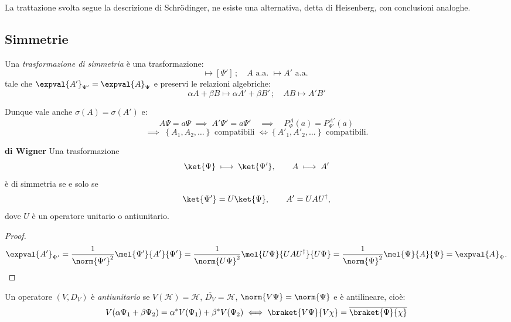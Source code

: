 \begin{remark}
    La trattazione svolta segue la descrizione di Schrödinger, ne esiste una alternativa, detta di Heisenberg, con conclusioni analoghe.
\end{remark}

\subsection{Simmetrie}\label{sec: sim_intro}

\begin{definition}
    Una \textit{trasformazione di simmetria} è una trasformazione:
    \begin{equation}
        [\Psi] \mapsto [\Psi']  \,;\quad A \text{ a.a. } \mapsto A' \text{ a.a. }
    \end{equation}
    tale che \(\expval{A'}_{\Psi'}= \expval{A}_{\Psi}\) e preservi le relazioni algebriche:
    \begin{equation}
        \alpha A +\beta B \mapsto \alpha A' + \beta B'  \,; \quad AB \mapsto A'B'
    \end{equation}
\end{definition}
Dunque vale anche \(\sigma(A) = \sigma(A')\) e:
\[
A\Psi = a\Psi \;\implies\; A'\Psi' = a\Psi' 
\quad\implies\quad
P^A_\Psi(a) = P^{A'}_{\Psi'}(a)
\]
\[
\implies \;
\left\{ A_1, A_2, \dots \right\} 
\text{ compatibili }
\iff
\left\{ A'_1, A'_2, \dots \right\} 
\text{ compatibili.}
\]


\begin{theorem} \label{theo: Wigner}
    {\normalfont\textbf{di Wigner}}
Una trasformazione
\[
\ket{\Psi} \;\longmapsto\; \ket{\Psi'} ,
\qquad
A \;\longmapsto\; A'
\]
è di simmetria se e solo se
\begin{equation}
    \ket{\Psi'} = U\ket{\Psi},
    \qquad
    A' = U A U^{\dagger},
\end{equation}
dove \( U \) è un operatore unitario o antiunitario.
\end{theorem}
\begin{proof}
\[
\expval{A'}_{\Psi'} 
= \frac{1}{\norm{\Psi'}^2} 
\mel{\Psi'}{A'}{\Psi'}
= \frac{1}{\norm{U\Psi}^2} 
\mel{U\Psi}{U A U^{\dagger}}{U\Psi}
= \frac{1}{\norm{\Psi}^2} \mel{\Psi}{A}{\Psi}
= \expval{A}_{\Psi}.
\]  
\end{proof}

\begin{definition}
    Un operatore \((V, D_V)\) è \textit{antiunitario} se \(V(\mathcal{H})=\mathcal{H}\), \(\overline{D_V}=\mathcal{H}\), \(\norm{V\Psi}= \norm{\Psi}\) e è antilineare, cioè:
    \begin{equation}
        V(\alpha \Psi_1 + \beta \Psi_2) = \alpha^* V(\Psi_1)+ \beta^* V(\Psi_2)  \iff \braket{V\Psi}{V\chi} = \overline{\braket{\Psi}{\chi}}
    \end{equation}
\end{definition}

